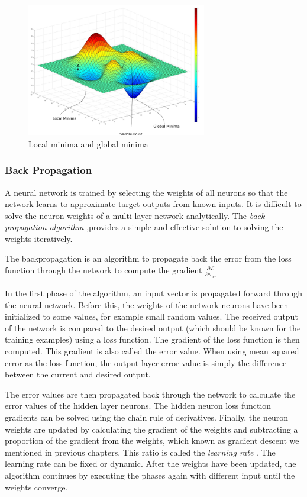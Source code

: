 \begin{figure}[h]
	\includegraphics[width=0.7\textwidth]{Figures/Section3_GD_localminima.png} 
	\centering
	\captionsetup{justification=centering}
	\caption{Local minima and global minima}
	\label{fig:localminima}
\end{figure}

\subsubsection*{Back Propagation}
A neural network is trained by selecting the weights of all neurons so that the network learns to approximate target outputs from known inputs. It is difficult to solve the neuron weights of a multi-layer network analytically. The \textit{back-propagation algorithm} \cite{bishop2006pattern,goodfellow2016deep},provides a simple and effective solution to solving the weights iteratively. 

The backpropagation is an algorithm to propagate back the error from the loss function through the network to compute the gradient $ \frac{\partial \mathcal{L}}{\partial w_{ij}} $

In the first phase of the algorithm, an input vector is propagated forward through the neural network. Before this, the weights of the network neurons have been initialized to some values, for example small random values. The received output of the network is compared to the desired output (which should be known for the training examples) using a loss function. The gradient of the loss function is then computed. This gradient is also called the error value. When using mean squared error as the loss function, the output layer error value is simply the difference between the current and desired output.

The error values are then propagated back through the network to calculate the error values of the hidden layer neurons. The hidden neuron loss function gradients can be solved using the chain rule of derivatives. Finally, the neuron weights are updated by calculating the gradient of the weights and subtracting a proportion of the gradient from the weights, which known as gradient descent we mentioned in previous chapters. This ratio is called the \textit{learning rate} \cite{bishop2006pattern}. The learning rate can be fixed or dynamic. After the weights have been updated, the algorithm continues by executing the phases again with different input until the weights converge.

